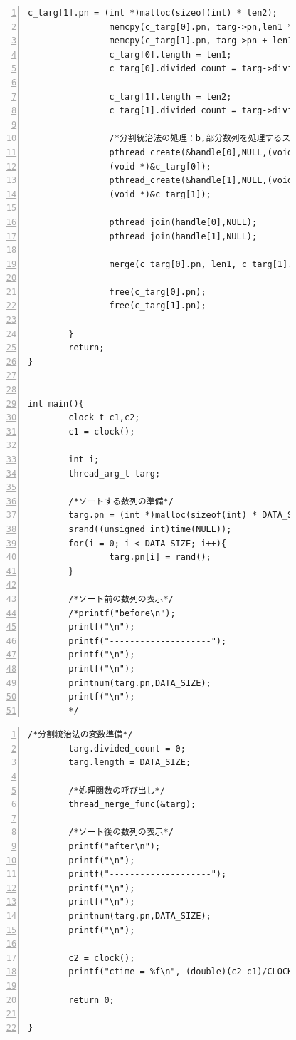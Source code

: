 \documentclass[11pt,a4paper]{jsarticle}
\begin{document}
\begin{figure}[htbp]
 \begin{center}
  \begin{Verbatim}[frame=single,baselinestretch=1,fontsize=\footnotesize,numbers=left]
				c_targ[1].pn = (int *)malloc(sizeof(int) * len2);
				memcpy(c_targ[0].pn, targ->pn,len1 * sizeof(int));
				memcpy(c_targ[1].pn, targ->pn + len1, len2 * sizeof(int));
				c_targ[0].length = len1;
				c_targ[0].divided_count = targ->divided_count + 1;

				c_targ[1].length = len2;
                c_targ[1].divided_count = targ->divided_count + 1;

				/*分割統治法の処理：b,部分数列を処理するスレッドの生成*/
				pthread_create(&handle[0],NULL,(void *)thread_merge_func,
				(void *)&c_targ[0]);
				pthread_create(&handle[1],NULL,(void *)thread_merge_func,
				(void *)&c_targ[1]);

				pthread_join(handle[0],NULL);
				pthread_join(handle[1],NULL);

				merge(c_targ[0].pn, len1, c_targ[1].pn,len2,targ->pn);

				free(c_targ[0].pn);
				free(c_targ[1].pn);

		}
		return;
}


int main(){
		clock_t c1,c2;
   		c1 = clock();
   		
		int i;
		thread_arg_t targ;

        /*ソートする数列の準備*/
		targ.pn = (int *)malloc(sizeof(int) * DATA_SIZE);
		srand((unsigned int)time(NULL));
		for(i = 0; i < DATA_SIZE; i++){
				targ.pn[i] = rand();
		}

		/*ソート前の数列の表示*/
		/*printf("before\n");
		printf("\n");
		printf("--------------------");
		printf("\n");
		printf("\n");
		printnum(targ.pn,DATA_SIZE);
		printf("\n");
		*/
  \end{Verbatim}
 \end{center}
\end{figure}
\begin{figure}[htbp]
 \begin{center}
  \begin{Verbatim}[frame=single,baselinestretch=1,fontsize=\footnotesize,numbers=left]
		/*分割統治法の変数準備*/
		targ.divided_count = 0;
		targ.length = DATA_SIZE;

		/*処理関数の呼び出し*/
		thread_merge_func(&targ);

		/*ソート後の数列の表示*/
		printf("after\n");
		printf("\n");
		printf("--------------------");
		printf("\n");
		printf("\n");
		printnum(targ.pn,DATA_SIZE);
		printf("\n");
		
		c2 = clock();
    	printf("ctime = %f\n", (double)(c2-c1)/CLOCKS_PER_SEC);

		return 0;
		
}
  \end{Verbatim}
 \end{center}
\end{figure}
\end{document}
